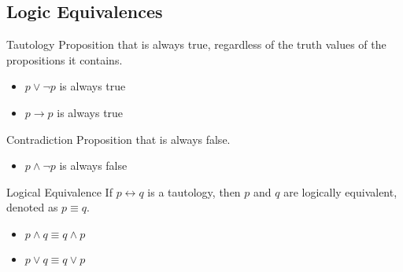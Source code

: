 \documentclass{article}
\begin{document}
\subsection{Logic Equivalences}

\begin{theorem}{Tautology}
    Proposition that is always true, regardless of the truth values of the propositions it contains.

    \tcblower
    \begin{itemize}
        \item $p \lor \neg p$ is always true
        \item $p \rightarrow p$ is always true
    \end{itemize}
\end{theorem}

\begin{theorem}{Contradiction}
    Proposition that is always false.

    \tcblower
    \begin{itemize}
        \item $p \land \neg p$ is always false
    \end{itemize}
\end{theorem}

\begin{theorem}{Logical Equivalence}
    If $p \leftrightarrow q$ is a tautology, then $p$ and $q$ are logically equivalent, denoted as $p \equiv q$.

    \tcblower
    \begin{itemize}
        \item $p \land q \equiv q \land p$
        \item $p \lor q \equiv q \lor p$
    \end{itemize}
\end{theorem}

\end{document}

